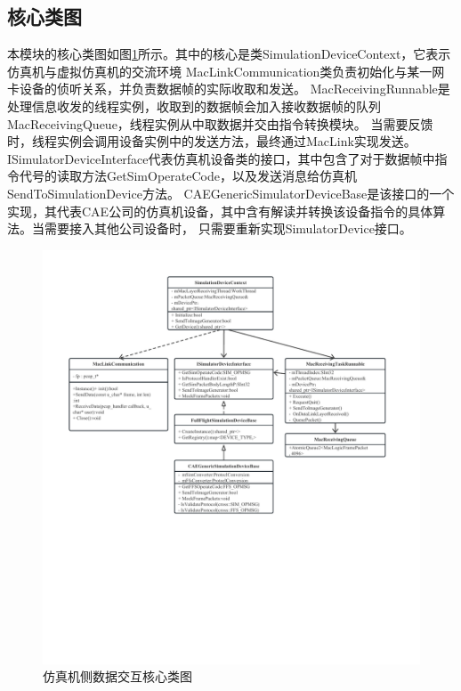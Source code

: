 \subsection{核心类图}
\par
本模块的核心类图如图\ref{module12}所示。其中的核心是类SimulationDeviceContext，它表示仿真机与虚拟仿真机的交流环境
MacLinkCommunication类负责初始化与某一网卡设备的侦听关系，并负责数据帧的实际收取和发送。
MacReceivingRunnable是处理信息收发的线程实例，收取到的数据帧会加入接收数据帧的队列MacReceivingQueue，线程实例从中取数据并交由指令转换模块。
当需要反馈时，线程实例会调用设备实例中的发送方法，最终通过MacLink实现发送。
ISimulatorDeviceInterface代表仿真机设备类的接口，其中包含了对于数据帧中指令代号的读取方法GetSimOperateCode，以及发送消息给仿真机SendToSimulationDevice方法。
CAEGenericSimulatorDeviceBase是该接口的一个实现，其代表CAE公司的仿真机设备，其中含有解读并转换该设备指令的具体算法。当需要接入其他公司设备时，
只需要重新实现SimulatorDevice接口。
\clearpage
\begin{figure}[h!]
    \begin{center}
        \includegraphics[width=\textwidth]{pictures/classdiagram1.pdf}
        \caption{仿真机侧数据交互核心类图}
        \label{module12}
    \end{center}
\end{figure}
